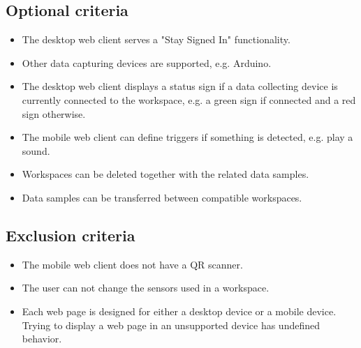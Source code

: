 \subsection{Optional criteria}
\begin{itemize}
    \item The desktop web client serves a "Stay Signed In" functionality.
    \item Other data capturing devices are supported, e.g. Arduino.
    \item The desktop web client displays a status sign if a data collecting device is currently connected to the workspace, e.g. a green sign if connected and a red sign otherwise.
    \item The mobile web client can define triggers if something is detected, e.g. play a sound.
    \item Workspaces can be deleted together with the related data samples.
    \item Data samples can be transferred between compatible workspaces.
\end{itemize}

\subsection{Exclusion criteria}
\begin{itemize}
    \item The mobile web client does not have a QR scanner.
    \item The user can not change the sensors used in a workspace.
    \item Each web page is designed for either a desktop device or a mobile device. Trying to display a web page in an unsupported device has undefined behavior.
\end{itemize}
